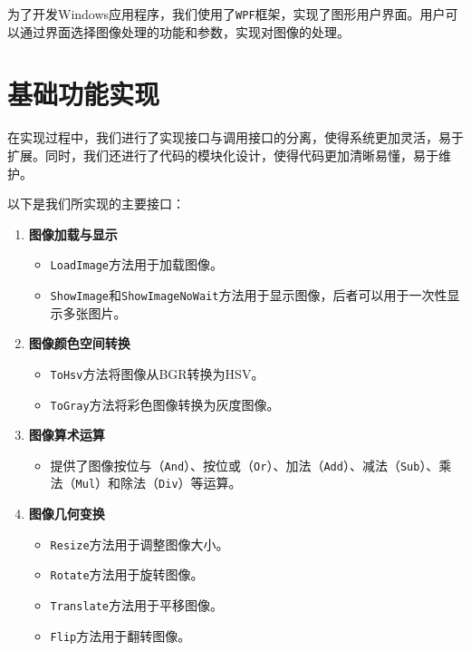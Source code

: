 \documentclass[UTF8,openany]{ctexbook}
\begin{document}
为了开发Windows应用程序，我们使用了\texttt{WPF}框架，实现了图形用户界面。用户可以通过界面选择图像处理的功能和参数，实现对图像的处理。

\section{基础功能实现}

在实现过程中，我们进行了实现接口与调用接口的分离，使得系统更加灵活，易于扩展。同时，我们还进行了代码的模块化设计，使得代码更加清晰易懂，易于维护。

以下是我们所实现的主要接口：

\begin{enumerate}[label=\arabic*., leftmargin=*]

  \item \textbf{图像加载与显示}
    \begin{itemize}[label=--, leftmargin=*]
      \item \texttt{LoadImage}方法用于加载图像。
      \item \texttt{ShowImage}和\texttt{ShowImageNoWait}方法用于显示图像，后者可以用于一次性显示多张图片。
    \end{itemize}
  
  \item \textbf{图像颜色空间转换}
    \begin{itemize}[label=--, leftmargin=*]
      \item \texttt{ToHsv}方法将图像从BGR转换为HSV。
      \item \texttt{ToGray}方法将彩色图像转换为灰度图像。
    \end{itemize}
  
  \item \textbf{图像算术运算}
    \begin{itemize}[label=--, leftmargin=*]
      \item 提供了图像按位与（\texttt{And}）、按位或（\texttt{Or}）、加法（\texttt{Add}）、减法（\texttt{Sub}）、乘法（\texttt{Mul}）和除法（\texttt{Div}）等运算。
    \end{itemize}
  
  \item \textbf{图像几何变换}
    \begin{itemize}[label=--, leftmargin=*]
      \item \texttt{Resize}方法用于调整图像大小。
      \item \texttt{Rotate}方法用于旋转图像。
      \item \texttt{Translate}方法用于平移图像。
      \item \texttt{Flip}方法用于翻转图像。
    \end{itemize}
  

\end{enumerate}
\end{document}

